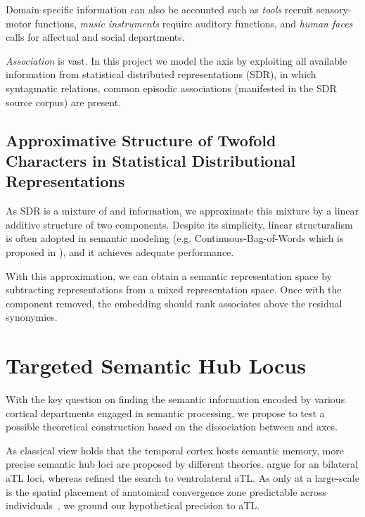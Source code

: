 Domain-specific information can also be accounted such as \emph{tools} recruit sensory-motor functions, \emph{music instruments} require auditory functions, and \emph{human faces} calls for affectual and social departments.

\emph{Association} is vast. In this project we model the \association axis by exploiting all available information from statistical distributed representations (SDR), in which syntagmatic relations, common episodic associations (manifested in the SDR source corpus) are present.

\subsection{Approximative Structure of Twofold Characters in Statistical Distributional Representations}

\label{subsection:hyplinearsemantics}
As SDR is a mixture of \similarity and \association information, we approximate this mixture by a linear additive structure of two components. Despite its simplicity, linear structuralism is often adopted in semantic modeling (e.g. Continuous-Bag-of-Words which is proposed in \textcite{mikolovEfficientEstimationWord2013}), and it achieves adequate performance. 

With this approximation, we can obtain a semantic \association representation space by subtracting \similarity representations from a mixed representation space. Once with the \similarity component removed, the embedding should rank associates above the residual synonymies.

\section{Targeted Semantic Hub Locus}

With the key question on finding the semantic information encoded by various cortical departments engaged in semantic processing, we propose to test a possible theoretical construction based on the dissociation between \similarity and \association axes. 

As classical view holds that the temporal cortex hosts semantic memory, more precise semantic hub loci are proposed by different theories. \textcite{priceMetaanalysesObjectNaming2005, pattersonWhereYouKnow2007, binderMappingAnteriorTemporal2011} argue for an bilateral aTL loci, whereas \textcite{ralphNeuralComputationalBases2017} refined the search to ventrolateral aTL. As only at a large-scale is the spatial placement of anatomical convergence zone predictable across individuals~\parencite{damasioNeuralSystemsWord2004}, we ground our hypothetical precision to aTL.

